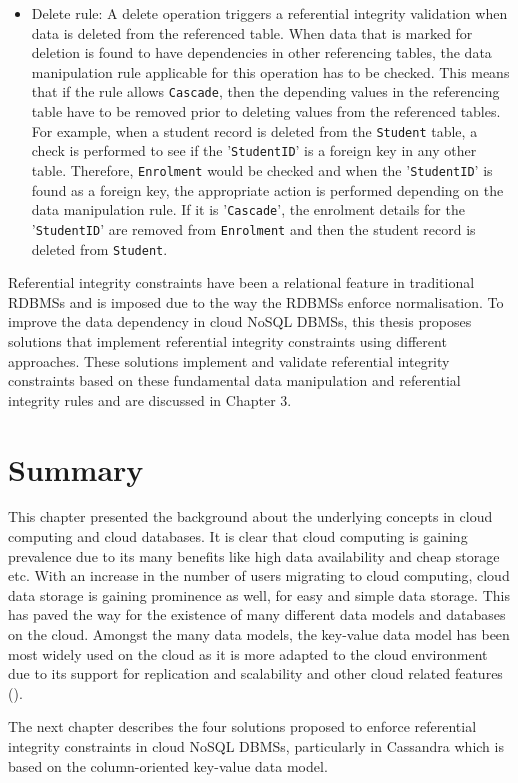 \begin{itemize}
\item Delete rule: A delete operation triggers a referential integrity
validation when data is deleted from the referenced table.  When data that is marked
for deletion is found to have dependencies in other referencing tables,   the
data manipulation rule applicable for this operation has to be checked.  This
means that if the rule allows \texttt{Cascade},   then the depending values in the
referencing table have to be removed prior to deleting values from the
referenced tables.  For example,   when a student record is deleted from the
\texttt{Student} table,   a check is performed to see if the '\texttt{StudentID}'
is a foreign key in any other table.  Therefore,   \texttt{Enrolment} would be
checked and when the '\texttt{StudentID}' is found as a foreign key,   the
appropriate action is performed depending on the data manipulation rule.  If it
is '\texttt{Cascade}',   the enrolment details for the '\texttt{StudentID}' are
removed from \texttt{Enrolment} and then the student record is deleted from
\texttt{Student}. 

\end{itemize}

Referential integrity constraints have been a relational feature in traditional
\acp{RDBMS} and is imposed due to the way the \acp{RDBMS} enforce normalisation. 
To improve the data dependency in cloud \ac{NoSQL} \acp{DBMS},   this
thesis proposes solutions that implement referential integrity constraints using
different approaches. These solutions implement and
validate referential integrity constraints based on these fundamental data manipulation and
referential integrity rules and are discussed in Chapter 3.




\section{Summary}



This chapter presented the background about the underlying concepts in cloud
computing and cloud databases.  It is clear that cloud computing is gaining
prevalence due to its many benefits like high data availability and cheap
storage etc.  With an increase in the number of users
migrating to cloud computing,   cloud data storage is gaining prominence as well,  
for easy and simple data storage.  This has paved the way for the existence
of many different data models and databases on the cloud.  Amongst the many data
models,   the key-value data model has been  most widely used  on the cloud
as it is more adapted to the cloud environment due to its support for
replication and scalability and other cloud related features (). 



The next chapter describes the four solutions proposed to enforce referential
integrity constraints in cloud \ac{NoSQL} \acp{DBMS},   particularly in
Cassandra which is based on the column-oriented key-value data model. 





